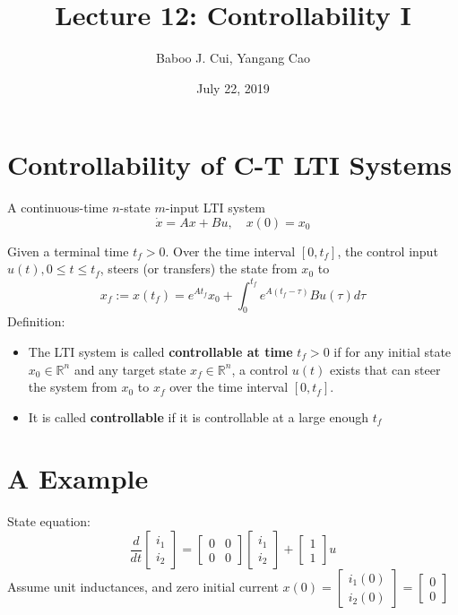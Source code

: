 \documentclass[10pt,a4paper,oneside]{article}
\date{July 22, 2019}
\author{Baboo J. Cui, Yangang Cao}
\title{Lecture 12: Controllability I}
\begin{document}
\maketitle
\tableofcontents
\newpage
\section{Controllability of C-T LTI Systems}
A continuous-time $n$-state $m$-input LTI system
\begin{equation}
\dot{x}=Ax+Bu,\quad x(0)=x_0
\end{equation}

Given a terminal time $t_{f}>0$. Over the time interval $\left[0, t_{f}\right]$, the control
input $u(t), 0 \leq t \leq t_{f}$, steers (or transfers) the state from $x_{0}$ to
\[
x_{f} :=x\left(t_{f}\right)=e^{A t_{f}} x_{0}+\int_{0}^{t_{f}} e^{A\left(t_{f}-\tau\right)} B u(\tau) d \tau
\]
Definition:
\begin{itemize}
\item The LTI system is called {\bfseries controllable at time} $t_f>0$ if for any initial state $x_0\in\mathbb{R}^n$ and any target state $x_f\in\mathbb{R}^n$, a control $u(t)$ exists that can steer the system from $x_0$ to $x_f$ over the time interval $[0, t_f]$.
\item It is called {\bfseries controllable} if it is controllable at a large enough $t_f$
\end{itemize}
\section{A Example}
State equation:
\[
\frac{d}{d t}\left[\begin{array}{l}{i_{1}} \\ {i_{2}}\end{array}\right]=\left[\begin{array}{ll}{0} & {0} \\ {0} & {0}\end{array}\right]\left[\begin{array}{l}{i_{1}} \\ {i_{2}}\end{array}\right]+\left[\begin{array}{l}{1} \\ {1}\end{array}\right] u
\]
Assume unit inductances, and zero initial current $x(0)=\left[\begin{array}{l}{i_{1}(0)} \\ {i_{2}(0)}\end{array}\right]=\left[\begin{array}{l}{0} \\ {0}\end{array}\right]$
\end{document}
